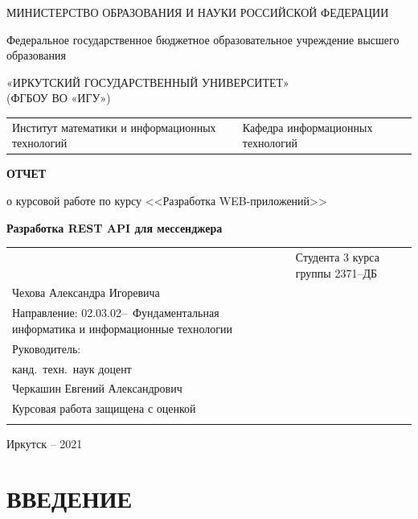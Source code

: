 \documentclass[14pt,final]{report}
\begin{document}
\thispagestyle{empty}
\begin{center}
МИНИСТЕРСТВО ОБРАЗОВАНИЯ И НАУКИ РОССИЙСКОЙ ФЕДЕРАЦИИ

Федеральное государственное бюджетное образовательное учреждение высшего образования

«ИРКУТСКИЙ  ГОСУДАРСТВЕННЫЙ УНИВЕРСИТЕТ»\\
(ФГБОУ ВО «ИГУ»)
\end{center}
\vfill %

\noindent\begin{tabularx}{\textwidth} {
  >{\raggedright\arraybackslash}X
  >{\raggedright\arraybackslash}X }
Институт математики и информационных технологий
&
Кафедра информационных технологий
\end{tabularx}

\vfill
\begin{center}
  \textbf{ОТЧЕТ}
\vspace{1em}

о курсовой работе по курсу <<Разработка WEB-приложений>>

{\bf Разработка REST API для мессенджера}

\end{center}
\vfill

\noindent\begin{tabularx}{\textwidth} {
  >{\raggedright\arraybackslash}X
  >{\raggedright}X }
&

Студента 3 курса группы 2371--ДБ\\
Чехова Александра Игоревича\\
Направление\;: 02.03.02--~Фундаментальная информатика и информационные технологии\\[2em]

Руководитель:\\
канд.~техн.~наук доцент\\
Черкашин Евгений Александрович\\[2em]

Курсовая работа защищена с оценкой\\[1em] \underline{\hspace{3cm}}
\end{tabularx}
\vfill
\begin{center}
  Иркутск -- 2021
\end{center}
\clearpage

\tableofcontents

\chapter*{ВВЕДЕНИЕ}
\label{chap:intro}
\end{document}
